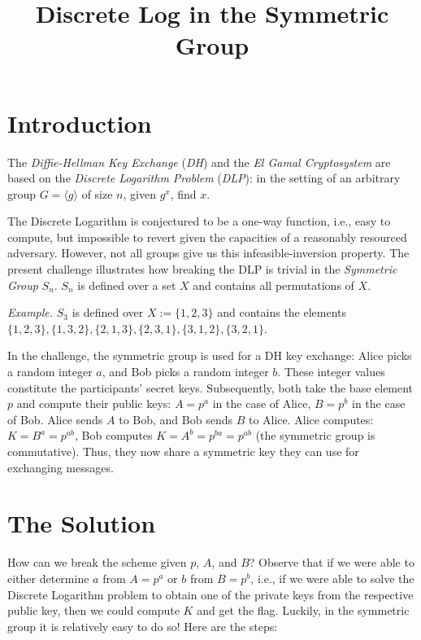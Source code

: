 \documentclass{article}
\title{Discrete Log in the Symmetric Group}
\begin{document}
\maketitle

\section{Introduction}

The \emph{Diffie-Hellman Key Exchange} (\emph{DH}) and the \emph{El Gamal Cryptosystem} are based on the \emph{Discrete Logarithm Problem} (\emph{DLP}): in the setting of an arbitrary group $G = \langle g \rangle$ of size $n$, given $g^x$, find $x$. \medskip 

The Discrete Logarithm is conjectured to be a one-way function, i.e., easy to compute, but impossible to revert given the capacities of a reasonably resourced adversary. However, not all groups give us this infeasible-inversion property. The present challenge illustrates how breaking the DLP is trivial in the \emph{Symmetric Group} $S_n$. $S_n$ is defined over a set $X$ and contains all permutations of $X$. 

\begin{center}
    \emph{Example.} $S_3$ is defined over $X := \{1,2,3\}$ and contains the elements $\{1,2,3\}, \{1,3,2\}, \{2,1,3\}, \{2,3,1\}, \{3,1,2\}, \{3,2,1\}$.
\end{center}

In the challenge, the symmetric group is used for a DH key exchange: Alice picks a random integer $a$, and Bob picks a random integer $b$. These integer values constitute the participants' secret keys. Subsequently, both take the base element $p$ and compute their public keys: $A = p^a$ in the case of Alice, $B = p^b$ in the case of Bob. Alice sends $A$ to Bob, and Bob sends $B$ to Alice. Alice computes: $K = B^a = p^{ab}$, Bob computes $K = A^b = p^{ba} = p^{ab}$ (the symmetric group is commutative). Thus, they now share a symmetric key they can use for exchanging messages. 

\section{The Solution}

How can we break the scheme given $p$, $A$, and $B$? Observe that if we were able to either determine $a$ from $A = p^a$ or $b$ from $B = p^b$, i.e., if we were able to solve the Discrete Logarithm problem to obtain one of the private keys from the respective public key, then we could compute $K$ and get the flag. Luckily, in the symmetric group it is relatively easy to do so! Here are the steps:
\end{document}
